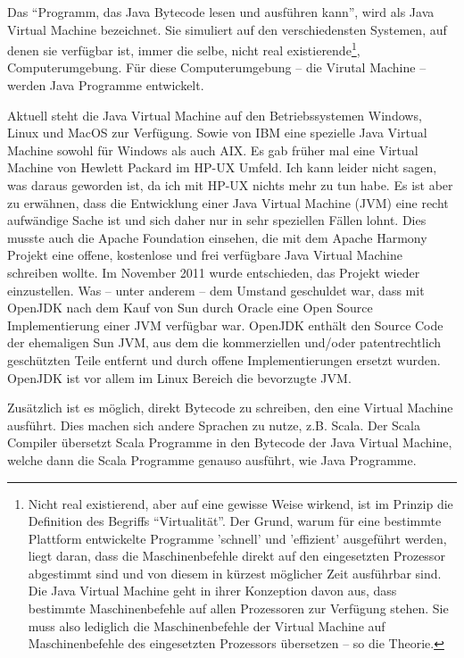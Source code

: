 Das "`Programm, das Java Bytecode lesen und ausführen kann"', wird als Java Virtual Machine bezeichnet. Sie simuliert auf den verschiedensten Systemen, auf denen sie verfügbar ist, immer die selbe, nicht real existierende\footnote{Nicht real existierend, aber auf eine gewisse Weise wirkend, ist im Prinzip die Definition des Begriffs "`Virtualität"'. Der Grund, warum für eine bestimmte Plattform entwickelte Programme 'schnell' und 'effizient' ausgeführt werden, liegt daran, dass die Maschinenbefehle direkt auf den eingesetzten Prozessor abgestimmt sind und von diesem in kürzest möglicher Zeit ausführbar sind. Die Java Virtual Machine geht in ihrer Konzeption davon aus, dass bestimmte Maschinenbefehle auf allen Prozessoren zur Verfügung stehen. Sie muss also lediglich die Maschinenbefehle der Virtual Machine auf Maschinenbefehle des eingesetzten Prozessors übersetzen -- so die Theorie.}, Computerumgebung. Für diese Computerumgebung -- die Virutal Machine -- werden Java Programme entwickelt. 

Aktuell steht die Java Virtual Machine auf den Betriebssystemen Windows, Linux und MacOS zur Verfügung. Sowie von IBM eine spezielle Java Virtual Machine sowohl für Windows als auch AIX. Es gab früher mal eine Virtual Machine von Hewlett Packard im HP-UX Umfeld. Ich kann leider nicht sagen, was daraus geworden ist, da ich mit HP-UX nichts mehr zu tun habe. Es ist aber zu erwähnen, dass die Entwicklung einer Java Virtual Machine (JVM) eine recht aufwändige Sache ist und sich daher nur in sehr speziellen Fällen lohnt. Dies musste auch die Apache Foundation einsehen, die mit dem Apache Harmony Projekt eine offene, kostenlose und frei verfügbare Java Virtual Machine schreiben wollte. Im November 2011 wurde entschieden, das Projekt wieder einzustellen. Was -- unter anderem -- dem Umstand geschuldet war, dass mit OpenJDK nach dem Kauf von Sun durch Oracle eine Open Source Implementierung einer JVM verfügbar war. OpenJDK enthält den Source Code der ehemaligen Sun JVM, aus dem die kommerziellen und/oder patentrechtlich geschützten Teile entfernt und durch offene Implementierungen ersetzt wurden. OpenJDK ist vor allem im Linux Bereich die bevorzugte JVM.

Zusätzlich ist es möglich, direkt Bytecode zu schreiben, den eine Virtual Machine ausführt. Dies machen sich andere Sprachen zu nutze, z.B. Scala. Der Scala Compiler übersetzt Scala Programme in den Bytecode der Java Virtual Machine, welche dann die Scala Programme genauso ausführt, wie Java Programme. 

